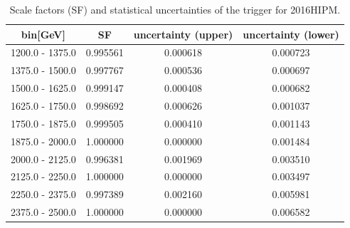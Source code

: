 \begin{table}
	\centering
	\caption{Scale factors (SF) and statistical uncertainties of the \HT trigger for 2016HIPM.}
	\label{tab:2016HIPM_triggerSF}
	\begin{tabular}{cccc}
		\hline
		\HT bin[GeV]    & SF       & uncertainty (upper) & uncertainty (lower) \\
		\hline
		1200.0 - 1375.0 & 0.995561 & 0.000618            & 0.000723            \\
		1375.0 - 1500.0 & 0.997767 & 0.000536            & 0.000697            \\
		1500.0 - 1625.0 & 0.999147 & 0.000408            & 0.000682            \\
		1625.0 - 1750.0 & 0.998692 & 0.000626            & 0.001037            \\
		1750.0 - 1875.0 & 0.999505 & 0.000410            & 0.001143            \\
		1875.0 - 2000.0 & 1.000000 & 0.000000            & 0.001484            \\
		2000.0 - 2125.0 & 0.996381 & 0.001969            & 0.003510            \\
		2125.0 - 2250.0 & 1.000000 & 0.000000            & 0.003497            \\
		2250.0 - 2375.0 & 0.997389 & 0.002160            & 0.005981            \\
		2375.0 - 2500.0 & 1.000000 & 0.000000            & 0.006582            \\
		\hline
	\end{tabular}
\end{table}

